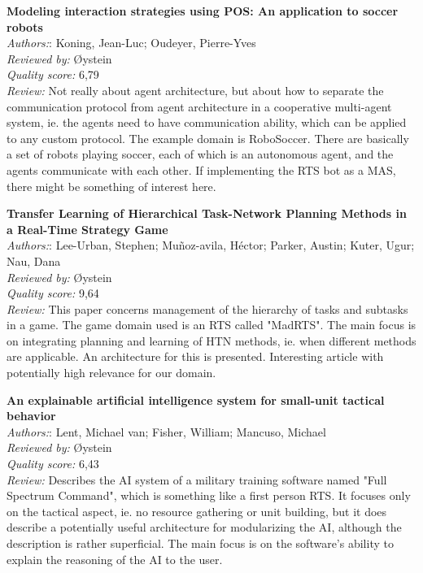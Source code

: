 \textbf{Modeling interaction strategies using POS: An application to soccer robots}\\
\textit{Authors:}: Koning, Jean-Luc; Oudeyer, Pierre-Yves\\
\textit{Reviewed by:} Øystein\\
\textit{Quality score:} 6,79\\
\textit{Review:} Not really about agent architecture, but about how to separate the communication protocol from agent architecture in a cooperative multi-agent system, ie. the agents need to have communication ability, which can be applied to any custom protocol. The example domain is RoboSoccer. There are basically a set of robots playing soccer, each of which is an autonomous agent, and the agents communicate with each other. If implementing the RTS bot as a MAS, there might be something of interest here.

\textbf{Transfer Learning of Hierarchical Task-Network Planning Methods in a Real-Time Strategy Game}\\
\textit{Authors:}: Lee-Urban, Stephen; Muñoz-avila, Héctor; Parker, Austin; Kuter, Ugur; Nau, Dana\\
\textit{Reviewed by:} Øystein\\
\textit{Quality score:} 9,64\\
\textit{Review:} This paper concerns management of the hierarchy of tasks and subtasks in a game. The game domain used is an RTS called "MadRTS". The main focus is on integrating planning and learning of HTN methods, ie. when different methods are applicable. An architecture for this is presented. Interesting article with potentially high relevance for our domain.

\textbf{An explainable artificial intelligence system for small-unit tactical behavior}\\
\textit{Authors:}: Lent, Michael van; Fisher, William; Mancuso, Michael\\
\textit{Reviewed by:} Øystein\\
\textit{Quality score:} 6,43\\
\textit{Review:} Describes the AI system of a military training software named "Full Spectrum Command", which is something like a first person RTS. It focuses only on the tactical aspect, ie. no resource gathering or unit building, but it does describe a potentially useful architecture for modularizing the AI, although the description is rather superficial. The main focus is on the software's ability to explain the reasoning of the AI to the user.

